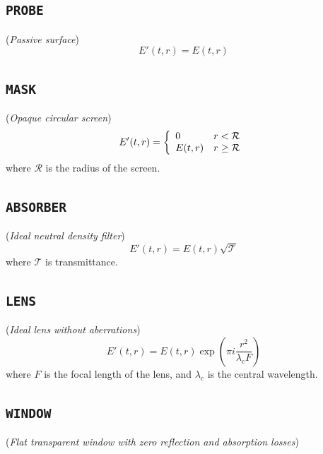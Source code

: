 \documentclass{report}
\begin{document}
\subsection*{\texttt{PROBE}}
(\textit{Passive surface})
\begin{equation}
E'(t,r) = E(t,r)
\end{equation}

\subsection*{\texttt{MASK}}
(\textit{Opaque circular screen})
\begin{equation}
E'(t,r) = \left\{ \begin{array}{ll}
  0         & r < \mathcal{R}\\
  E(t,r) & r \geq \mathcal{R}\end{array}\right.\\ 
\end{equation}
where $\mathcal{R}$ is the radius of the screen.

\subsection*{\texttt{ABSORBER}}
(\textit{Ideal neutral density filter})
\begin{equation}
E'(t,r) = E(t,r) \sqrt{\mathcal{T}}
\end{equation}
where $\mathcal{T}$ is transmittance.

\subsection*{\texttt{LENS}}
(\textit{Ideal lens without aberrations})
\begin{equation}
E'(t,r) = E(t,r) \exp\left( \pi i \frac{r^2}{\lambda_c F} \right)
\end{equation}
where $F$ is the focal length of the lens, and $\lambda_c$ is the central wavelength.

\subsection*{\texttt{WINDOW}}
(\textit{Flat transparent window with zero reflection and absorption losses})
\end{document}
